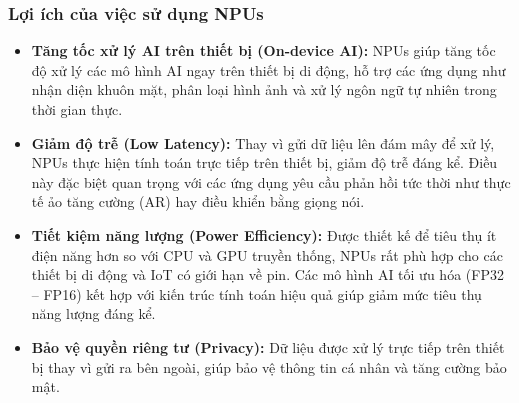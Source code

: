 \documentclass[a4paper]{article}
\begin{document}
\subsubsection{Lợi ích của việc sử dụng NPUs}
\begin{itemize}
    \item \textbf{Tăng tốc xử lý AI trên thiết bị (On-device AI):} NPUs giúp tăng tốc độ xử lý các mô hình AI ngay trên thiết bị di động, hỗ trợ các ứng dụng như nhận diện khuôn mặt, phân loại hình ảnh và xử lý ngôn ngữ tự nhiên trong thời gian thực.
    
    \item \textbf{Giảm độ trễ (Low Latency):} Thay vì gửi dữ liệu lên đám mây để xử lý, NPUs thực hiện tính toán trực tiếp trên thiết bị, giảm độ trễ đáng kể. Điều này đặc biệt quan trọng với các ứng dụng yêu cầu phản hồi tức thời như thực tế ảo tăng cường (AR) hay điều khiển bằng giọng nói.
    
    \item \textbf{Tiết kiệm năng lượng (Power Efficiency):} Được thiết kế để tiêu thụ ít điện năng hơn so với CPU và GPU truyền thống, NPUs rất phù hợp cho các thiết bị di động và IoT có giới hạn về pin. Các mô hình AI tối ưu hóa (FP32 – FP16) kết hợp với kiến trúc tính toán hiệu quả giúp giảm mức tiêu thụ năng lượng đáng kể.
    
    \item \textbf{Bảo vệ quyền riêng tư (Privacy):} Dữ liệu được xử lý trực tiếp trên thiết bị thay vì gửi ra bên ngoài, giúp bảo vệ thông tin cá nhân và tăng cường bảo mật.
\end{itemize}
\end{document}
